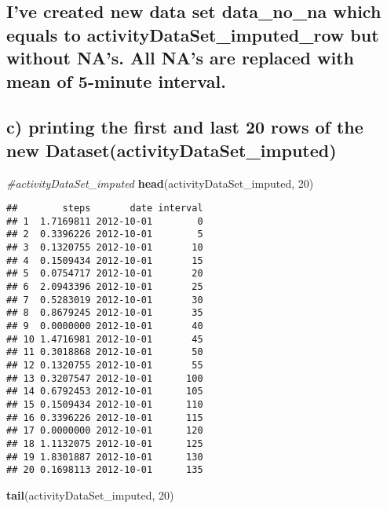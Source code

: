 \documentclass[
]{article}
\newenvironment{Shaded}{\begin{snugshade}}{\end{snugshade}}
\newcommand{\CommentTok}[1]{\textcolor[rgb]{0.56,0.35,0.01}{\textit{#1}}}
\newcommand{\DecValTok}[1]{\textcolor[rgb]{0.00,0.00,0.81}{#1}}
\newcommand{\KeywordTok}[1]{\textcolor[rgb]{0.13,0.29,0.53}{\textbf{#1}}}
\newcommand{\NormalTok}[1]{#1}
\begin{document}
\hypertarget{ive-created-new-data-set-data_no_na-which-equals-to-activitydataset_imputed_row-but-without-nas.-all-nas-are-replaced-with-mean-of-5-minute-interval.}{%
\subsection{I've created new data set data\_no\_na which equals to
activityDataSet\_imputed\_row but without NA's. All NA's are replaced
with mean of 5-minute
interval.}\label{ive-created-new-data-set-data_no_na-which-equals-to-activitydataset_imputed_row-but-without-nas.-all-nas-are-replaced-with-mean-of-5-minute-interval.}}

\hypertarget{c-printing-the-first-and-last-20-rows-of-the-new-datasetactivitydataset_imputed}{%
\subsection{c) printing the first and last 20 rows of the new
Dataset(activityDataSet\_imputed)}\label{c-printing-the-first-and-last-20-rows-of-the-new-datasetactivitydataset_imputed}}

\begin{Shaded}
\begin{Highlighting}[]
\CommentTok{#activityDataSet_imputed}
\KeywordTok{head}\NormalTok{(activityDataSet_imputed, }\DecValTok{20}\NormalTok{)}
\end{Highlighting}
\end{Shaded}

\begin{verbatim}
##        steps       date interval
## 1  1.7169811 2012-10-01        0
## 2  0.3396226 2012-10-01        5
## 3  0.1320755 2012-10-01       10
## 4  0.1509434 2012-10-01       15
## 5  0.0754717 2012-10-01       20
## 6  2.0943396 2012-10-01       25
## 7  0.5283019 2012-10-01       30
## 8  0.8679245 2012-10-01       35
## 9  0.0000000 2012-10-01       40
## 10 1.4716981 2012-10-01       45
## 11 0.3018868 2012-10-01       50
## 12 0.1320755 2012-10-01       55
## 13 0.3207547 2012-10-01      100
## 14 0.6792453 2012-10-01      105
## 15 0.1509434 2012-10-01      110
## 16 0.3396226 2012-10-01      115
## 17 0.0000000 2012-10-01      120
## 18 1.1132075 2012-10-01      125
## 19 1.8301887 2012-10-01      130
## 20 0.1698113 2012-10-01      135
\end{verbatim}

\begin{Shaded}
\begin{Highlighting}[]
\KeywordTok{tail}\NormalTok{(activityDataSet_imputed, }\DecValTok{20}\NormalTok{)}
\end{Highlighting}
\end{Shaded}
\end{document}
